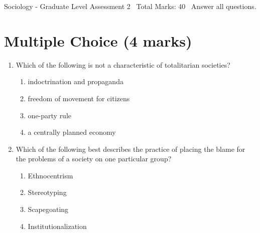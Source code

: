 \documentclass[12pt]{article}
\begin{document}
\begin{center}
Sociology - Graduate Level Assessment 2 \
Total Marks: 40 \
Answer all questions.
\end{center}

\section*{Multiple Choice (4 marks)}
\begin{enumerate}[label=\arabic*.]
\item Which of the following is not a characteristic of totalitarian societies?
\begin{enumerate}[label=(\alph*)]
    \item indoctrination and propaganda
    \item freedom of movement for citizens
    \item one-party rule
    \item a centrally planned economy
\end{enumerate}
\item Which of the following best describes the practice of placing the blame for the problems of a society on one particular group?
\begin{enumerate}[label=(\alph*)]
    \item Ethnocentrism
    \item Stereotyping
    \item Scapegoating
    \item Institutionalization
\end{enumerate}
\end{enumerate}
\end{document}
